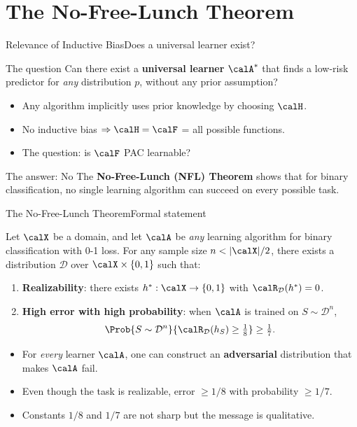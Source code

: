 \section{The No-Free-Lunch Theorem}

\begin{frame}{Relevance of Inductive Bias}{Does a universal learner exist?}
  \begin{block}{The question}
    Can there exist a \textbf{universal learner} $\calA^*$ that finds a low-risk predictor
    for \emph{any} distribution $p$, without any prior assumption?
  \end{block}
  \bigskip
  \begin{itemize}
    \item Any algorithm implicitly uses prior knowledge by choosing $\calH$.
    \item No inductive bias $\Rightarrow \calH = \calF$ = all possible functions.
    \item The question: is $\calF$ PAC learnable?
  \end{itemize}
  \bigskip
  \begin{alertblock}{The answer: No}
    The \textcolor{AlertRed}{\textbf{No-Free-Lunch (NFL) Theorem}} shows that for binary
    classification, no single learning algorithm can succeed on every possible task.
  \end{alertblock}
\end{frame}

\begin{frame}{The No-Free-Lunch Theorem}{Formal statement}
  \begin{mytheorem}
    Let $\calX$ be a domain, and let $\calA$ be \emph{any} learning algorithm for binary
    classification with 0-1 loss. For any sample size $n < |\calX|/2$, there exists a
    distribution $\mathcal{D}$ over $\calX\times\{0,1\}$ such that:
    \begin{enumerate}
      \item \textbf{Realizability}: there exists $h^*:\calX\to\{0,1\}$ with
            $\calR_\mathcal{D}(h^*)=0$.
      \item \textbf{High error with high probability}: when $\calA$ is trained on
            $S\sim\mathcal{D}^n$,
        \[
          \Prob{S\sim\mathcal{D}^n}{\calR_\mathcal{D}(h_S) \geq \tfrac{1}{8}} \geq \tfrac{1}{7}.
        \]
    \end{enumerate}
  \end{mytheorem}
  \bigskip
  \begin{itemize}
    \item For \emph{every} learner $\calA$, one can construct an \textbf{adversarial}
          distribution that makes $\calA$ fail.
    \item Even though the task is realizable, error $\geq 1/8$ with probability $\geq 1/7$.
    \item Constants $1/8$ and $1/7$ are not sharp but the message is qualitative.
  \end{itemize}
\end{frame}

